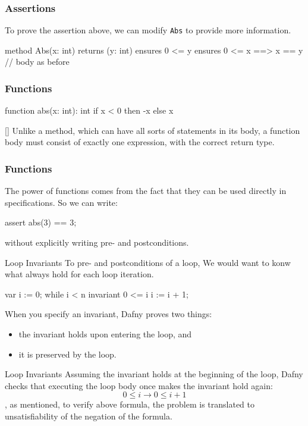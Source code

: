 \documentclass[10pt, compress]{beamer}
\begin{document}
\begin{frame}[fragile]
  \frametitle{Assertions}
  To prove the assertion above, we can modify \verb|Abs| to provide more information.
  \begin{verbnobox}[\footnotesize]
method Abs(x: int) returns (y: int)
   ensures 0 <= y
   ensures 0 <= x ==> x == y
{
   // body as before
}
  \end{verbnobox}
\end{frame}

\begin{frame}[fragile]
  \frametitle{Functions}
  \begin{verbnobox}[\footnotesize]
function abs(x: int): int
{
   if x < 0 then -x else x
}
  \end{verbnobox}[\footnotesize]
  Unlike a method, which can have all sorts of statements in its body, a function body must consist of exactly one expression, with the correct return type.
\end{frame}

\begin{frame}[fragile]
  \frametitle{Functions}
The power of functions comes from the fact that they can be used directly in specifications. So we can write:
  \begin{verbnobox}[\footnotesize]
assert abs(3) == 3;
  \end{verbnobox}
without explicitly writing pre- and postconditions.

\end{frame}

\begin{frame}[fragile]{Loop Invariants}
To pre- and postconditions of a loop, We would want to konw what always hold for each loop iteration.
  \begin{verbnobox}[\footnotesize]
var i := 0;
while i < n
   invariant 0 <= i
{
   i := i + 1;
}
  \end{verbnobox}
When you specify an invariant, Dafny proves two things:
  \begin{itemize}
  \item the invariant holds upon entering the loop, and
  \item it is preserved by the loop.
  \end{itemize}
\end{frame}

\begin{frame}[fragile]{Loop Invariants}
Assuming the invariant holds at the beginning of the loop, Dafny checks that executing the loop body once makes the invariant hold again:
    $$0 \leq i \to 0 \leq i + 1$$
, as mentioned, to verify above formula, the problem is translated to unsatisfiability of the negation of the formula.

\end{frame}
\end{document}
